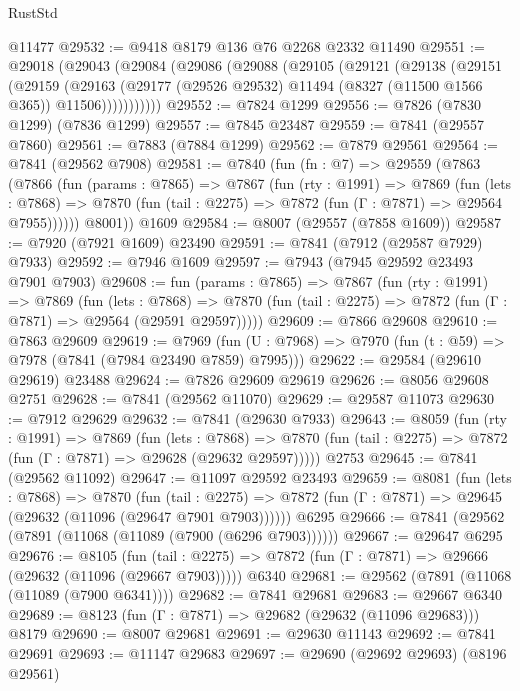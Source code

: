 \begin{lexlean}{RustStd}
\begin{coremodule}
    @11477
@29532 := @9418 @8179 @136 @76 @2268 @2332 @11490
@29551 := @29018
    (@29043
      (@29084
        (@29086
          (@29088
            (@29105
              (@29121
                (@29138
                  (@29151
                    (@29159
                      (@29163
                        (@29177 (@29526 @29532) @11494 (@8327 (@11500 @1566 @365)) @11506)))))))))))
@29552 := @7824 @1299
@29556 := @7826 (@7830 @1299) (@7836 @1299)
@29557 := @7845 @23487
@29559 := @7841 (@29557 @7860)
@29561 := @7883 (@7884 @1299)
@29562 := @7879 @29561
@29564 := @7841 (@29562 @7908)
@29581 := @7840
    (fun (fn : @7) =>
    @29559
      (@7863
        (@7866
          (fun (params : @7865) =>
          @7867
            (fun (rty : @1991) =>
            @7869
              (fun (lets : @7868) =>
              @7870 (fun (tail : @2275) => @7872 (fun (Γ : @7871) => @29564 @7955))))))
        @8001))
    @1609
@29584 := @8007 (@29557 (@7858 @1609))
@29587 := @7920 (@7921 @1609) @23490
@29591 := @7841 (@7912 (@29587 @7929) @7933)
@29592 := @7946 @1609
@29597 := @7943 (@7945 @29592 @23493 @7901 @7903)
@29608 := fun (params : @7865) =>
  @7867
    (fun (rty : @1991) =>
    @7869
      (fun (lets : @7868) =>
      @7870 (fun (tail : @2275) => @7872 (fun (Γ : @7871) => @29564 (@29591 @29597)))))
@29609 := @7866 @29608
@29610 := @7863 @29609
@29619 := @7969
    (fun (U : @7968) => @7970 (fun (t : @59) => @7978 (@7841 (@7984 @23490 @7859) @7995)))
@29622 := @29584 (@29610 @29619) @23488
@29624 := @7826 @29609 @29619
@29626 := @8056 @29608 @2751
@29628 := @7841 (@29562 @11070)
@29629 := @29587 @11073
@29630 := @7912 @29629
@29632 := @7841 (@29630 @7933)
@29643 := @8059
    (fun (rty : @1991) =>
    @7869
      (fun (lets : @7868) =>
      @7870 (fun (tail : @2275) => @7872 (fun (Γ : @7871) => @29628 (@29632 @29597)))))
    @2753
@29645 := @7841 (@29562 @11092)
@29647 := @11097 @29592 @23493
@29659 := @8081
    (fun (lets : @7868) =>
    @7870
      (fun (tail : @2275) =>
      @7872 (fun (Γ : @7871) => @29645 (@29632 (@11096 (@29647 @7901 @7903))))))
    @6295
@29666 := @7841 (@29562 (@7891 (@11068 (@11089 (@7900 (@6296 @7903))))))
@29667 := @29647 @6295
@29676 := @8105
    (fun (tail : @2275) => @7872 (fun (Γ : @7871) => @29666 (@29632 (@11096 (@29667 @7903)))))
    @6340
@29681 := @29562 (@7891 (@11068 (@11089 (@7900 @6341))))
@29682 := @7841 @29681
@29683 := @29667 @6340
@29689 := @8123 (fun (Γ : @7871) => @29682 (@29632 (@11096 @29683))) @8179
@29690 := @8007 @29681
@29691 := @29630 @11143
@29692 := @7841 @29691
@29693 := @11147 @29683
@29697 := @29690 (@29692 @29693) (@8196 @29561)

\end{coremodule}
\end{lexlean}
